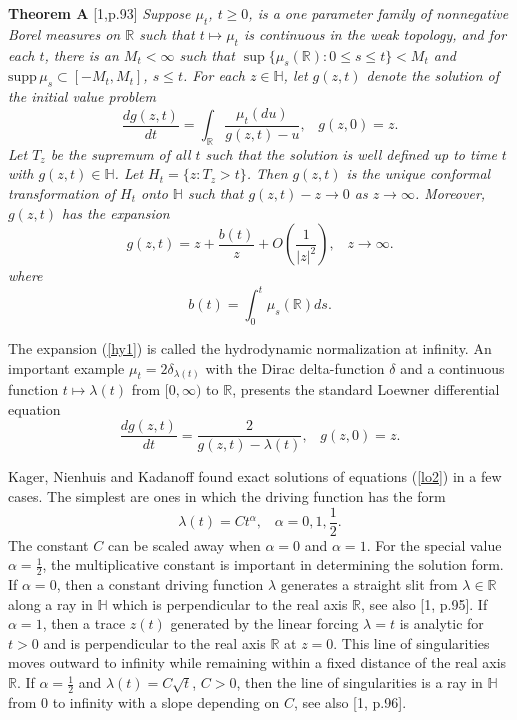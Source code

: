 \documentclass[
11pt,%
tightenlines,%
twoside,%
onecolumn,%
nofloats,%
nobibnotes,%
nofootinbib,%
superscriptaddress,%
noshowpacs,%
centertags]%
{revtex4}
\begin{document}
{\bf Theorem A} [1,p.93] {\it Suppose $\mu_t$, $t\geq0$, is a one parameter family of nonnegative Borel measures on $\mathbb R$ such that $t\mapsto\mu_t$ is continuous in the weak topology, and for each $t$, there is an $M_t<\infty$ such that $\sup\{\mu_s(\mathbb R):0\leq s\leq t\}<M_t$ and $\text{supp}\,\mu_s\subset[-M_t,M_t]$, $s\leq t$. For each $z\in\mathbb H$, let $g(z,t)$ denote the solution of the initial value problem
\begin{equation}
\frac{dg(z,t)}{dt}=\int_{\mathbb R}\frac{\mu_t(du)}{g(z,t)-u},\;\;\;g(z,0)=z. \label{lo1}
\end{equation}
Let $T_z$ be the supremum of all $t$ such that the solution is well defined up to time $t$ with $g(z,t)\in\mathbb H$. Let $H_t=\{z:T_z>t\}$. Then $g(z,t)$ is the unique conformal transformation of $H_t$ onto $\mathbb H$ such that $g(z,t)-z\to0$ as $z\to\infty$. Moreover, $g(z,t)$ has the expansion
\begin{equation}
g(z,t)=z+\frac{b(t)}{z}+O\left(\frac{1}{|z|^2}\right),\;\;\;z\to\infty. \label{hy1}
\end{equation}
where $$b(t)=\int_0^t\mu_s(\mathbb R)ds.$$}

The expansion (\ref{hy1}) is called the hydrodynamic normalization at infinity. An important example $\mu_t=2\delta_{\lambda(t)}$ with the Dirac delta-function $\delta$ and a continuous function $t\mapsto\lambda(t)$ from $[0,\infty)$ to $\mathbb R$, presents the standard Loewner differential equation
\begin{equation}
\frac{dg(z,t)}{dt}=\frac{2}{g(z,t)-\lambda(t)},\;\;\;g(z,0)=z. \label{lo2}
\end{equation}

Kager, Nienhuis and Kadanoff \cite{KagNieKad} found exact solutions of equations (\ref{lo2}) in a few cases. The simplest are ones in which the driving function has the form $$\lambda(t)=Ct^{\alpha},\;\;\;\alpha=0,1,\frac{1}{2}.$$ The constant $C$ can be scaled away when $\alpha=0$ and $\alpha=1$. For the special value $\alpha=\frac{1}{2}$, the multiplicative constant is important in determining the solution form. If $\alpha=0$, then a constant driving function $\lambda$ generates a straight slit from $\lambda\in\mathbb R$ along a ray in $\mathbb H$ which is perpendicular to the real axis $\mathbb R$, see also [1, p.95]. If $\alpha=1$, then a trace $z(t)$ generated by the linear forcing $\lambda=t$ is analytic for $t>0$ and is perpendicular to the real axis $\mathbb R$ at $z=0$. This line of singularities moves outward to infinity while remaining within a fixed distance of the real axis $\mathbb R$. If $\alpha=\frac{1}{2}$ and $\lambda(t)=C\sqrt t$, $C>0$, then the line of singularities is a ray in $\mathbb H$ from 0 to infinity with a slope depending on $C$, see also [1, p.96].
\end{document}

